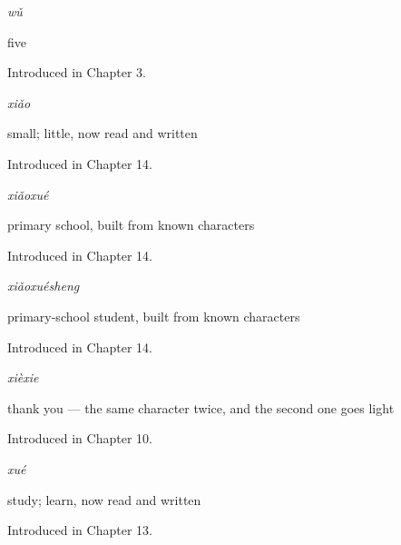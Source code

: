 \noindent\begin{minipage}[t]{\linewidth}
\raggedright
\textbf{}\enspace\emph{wǔ}\par
\small five\par
\footnotesize Introduced in Chapter 3.
\end{minipage}\par\medskip

\noindent\begin{minipage}[t]{\linewidth}
\raggedright
\textbf{}\enspace\emph{xiǎo}\par
\small small; little, now read and written\par
\footnotesize Introduced in Chapter 14.
\end{minipage}\par\medskip

\noindent\begin{minipage}[t]{\linewidth}
\raggedright
\textbf{}\enspace\emph{xiǎoxué}\par
\small primary school, built from known characters\par
\footnotesize Introduced in Chapter 14.
\end{minipage}\par\medskip

\noindent\begin{minipage}[t]{\linewidth}
\raggedright
\textbf{}\enspace\emph{xiǎoxuésheng}\par
\small primary-school student, built from known characters\par
\footnotesize Introduced in Chapter 14.
\end{minipage}\par\medskip

\noindent\begin{minipage}[t]{\linewidth}
\raggedright
\textbf{}\enspace\emph{xièxie}\par
\small thank you — the same character twice, and the second one goes light\par
\footnotesize Introduced in Chapter 10.
\end{minipage}\par\medskip

\noindent\begin{minipage}[t]{\linewidth}
\raggedright
\textbf{}\enspace\emph{xué}\par
\small study; learn, now read and written\par
\footnotesize Introduced in Chapter 13.
\end{minipage}\par\medskip

